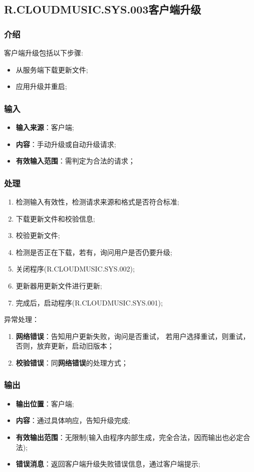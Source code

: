 \subsection{R.CLOUDMUSIC.SYS.003客户端升级}
\subsubsection{介绍}
客户端升级包括以下步骤:
	\begin{itemize}
		\item 从服务端下载更新文件;
		\item 应用升级并重启;
	\end{itemize}
\subsubsection{输入}
	\begin{itemize}
		\item \textbf{输入来源}：客户端;
		\item \textbf{内容}：手动升级或自动升级请求;
		\item \textbf{有效输入范围}：需判定为合法的请求；
	\end{itemize}
\subsubsection{处理}
	\begin{enumerate}
	\item 检测输入有效性，检测请求来源和格式是否符合标准;
  \item 下载更新文件和校验信息;
    \item 校验更新文件;
		\item 检测是否正在下载，若有，询问用户是否仍要升级;
		\item 关闭程序(R.CLOUDMUSIC.SYS.002);
		\item 更新器用更新文件进行更新;
		\item 完成后，启动程序(R.CLOUDMUSIC.SYS.001);
	\end{enumerate}
	\noindent 异常处理：
	\begin{enumerate}
		\item \textbf{网络错误}：告知用户更新失败，询问是否重试，
			若用户选择重试，则重试，否则，放弃更新，启动旧版本；
		\item \textbf{校验错误}：同\textbf{网络错误}的处理方式；
	\end{enumerate}
\subsubsection{输出}
\begin{itemize}
	\item \textbf{输出位置}：客户端;
	\item \textbf{内容}：通过具体响应，告知升级完成;
	\item \textbf{有效输出范围}：无限制(输入由程序内部生成，完全合法，因而输出也必定合法);
	\item \textbf{错误消息}：返回客户端升级失败错误信息，通过客户端提示;
\end{itemize}

